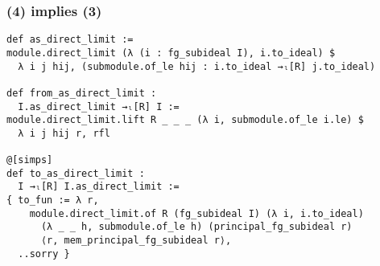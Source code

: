 \documentclass[aspectratio=169]{beamer}
\begin{document}
\begin{frame}[fragile]
\frametitle{(4) implies (3)}
\begin{minipage}{0.1\textwidth}
\end{minipage}%
\begin{minipage}{0.9\textwidth}
\begin{lstlisting}
def as_direct_limit :=
module.direct_limit (λ (i : fg_subideal I), i.to_ideal) $ 
  λ i j hij, (submodule.of_le hij : i.to_ideal →ₗ[R] j.to_ideal)

def from_as_direct_limit :
  I.as_direct_limit →ₗ[R] I :=
module.direct_limit.lift R _ _ _ (λ i, submodule.of_le i.le) $ 
  λ i j hij r, rfl

@[simps]
def to_as_direct_limit :
  I →ₗ[R] I.as_direct_limit :=
{ to_fun := λ r, 
    module.direct_limit.of R (fg_subideal I) (λ i, i.to_ideal) 
      (λ _ _ h, submodule.of_le h) (principal_fg_subideal r) 
      ⟨r, mem_principal_fg_subideal r⟩,
  ..sorry }
\end{lstlisting}
\end{minipage}%

\end{frame}
\end{document}
